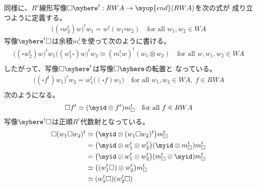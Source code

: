 	同様に、$R^c$線形写像$\square\myhere^t:RWA\to\myop{end}(RWA)$を次の式が
	成り立つように定義する。
	\begin{equation*}\begin{split} %
		\bigl((\square w_2^t)w\bigr)^tw_1 = w^t(w_1\square w_2)
		\quad\text{for all }w_1,w_2\in WA
	\end{split}\end{equation*} %
	写像$\myhere^t\square$は余積$m_\square^t$を使って次のように書ける。
	\begin{equation*}\begin{split} %
		\bigl((\square w_2^t)w\bigr)^tw_1
		\bigl((w_1^t\square)w\bigr)^tw_2 
		\simeq (m_\square^tw)^t(w_1\otimes w_2)
		\quad\text{for all }w,w_1,w_2\in WA \\
	\end{split}\end{equation*} %
	したがって、写像$\square\myhere^t$は写像$\square\myhere$の転置と
	なっている。
	\begin{equation*}\begin{split} %
		\bigl((\square f^t)w_1\bigr)^tw_2
		= w_1^t\bigl((\square f)w_1\bigr)
		\quad\text{for all }w_1,w_2\in WA,\;f\in RWA \\
	\end{split}\end{equation*} %
	次のようになる。
	\begin{equation*}\begin{split} %
		\square f^t \simeq (\myid\otimes f^t)m_\square^t 
		\quad\text{for all }f\in RWA \\
	\end{split}\end{equation*} %
	写像$\myhere^t\square$は正順$R^c$代数射となっている。
	\begin{equation*}\begin{split} %
		\square(w_1\square w_2)^t 
		&\simeq \bigl(\myid\otimes (w_1\square w_2)^t\bigr)m_\square^t \\
		&= \bigl(\myid\otimes w_1^t\otimes w_2^t\bigr)(\myid\otimes m_\square^t)m_\square^t \\
		&= \bigl(\myid\otimes w_1^t\otimes w_2^t\bigr)(m_\square^t\otimes \myid)m_\square^t \\
		&\simeq \bigl((w_1^t\square)\otimes w_2^t\bigr)m_\square^t \\
		&\simeq (w_1^t\square)(w_2^t\square) \\
	\end{split}\end{equation*} %

